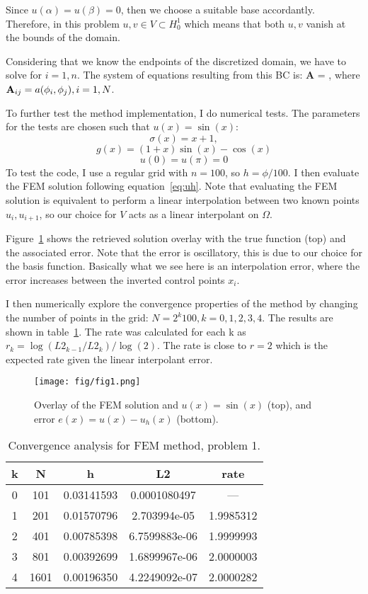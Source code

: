 \documentclass[10pt]{article}
\begin{document}
Since $u(\alpha)=u(\beta)=0$, then we choose a suitable base accordantly. Therefore, in this
problem $u,v \in V \subset H^1_0$ which means that both $u,v$ vanish at the bounds of the domain.

Considering that we know the endpoints of the discretized domain, we have to solve for 
$i=1,n$. The system of equations resulting from this BC is:
\beq
 {\bf A} \vec{\alpha} = ,
\label{eq:sdir}
\eeq
where ${\bf A}_{ij} = a(\phi_i,\phi_j), i=1,N$.

To further test the method implementation, I do numerical tests. The parameters for the tests are chosen
such that $u(x) = \sin(x)$:
\[
\sigma(x) = x+1,
\]
\[
g(x) = (1+x)\sin(x) -\cos(x)
\]
\[
u(0) = u(\pi) = 0
\]
To test the code, I use a regular grid with $n=100$, so $h = \phi/100$. I then evaluate the FEM solution
following equation~\ref{eq:uh}. Note that evaluating the FEM solution is equivalent to perform a linear
interpolation between two known points $u_i,u_{i+1}$, so our choice for $V$ acts as a linear interpolant on $\Omega$.

Figure~\ref{fig:fig1} shows the retrieved solution overlay with the true function (top) and the associated error.
Note that the error is oscillatory, this is due to our choice for the basis function. Basically what we see 
here is an interpolation error, where the error increases between the inverted control points $x_i$.

I then numerically explore the convergence properties of the method by changing the number of points in the grid:
$N = 2^k 100, k=0,1,2,3,4$. The results are shown in table~\ref{tab:table1}. The rate was calculated for 
each k as $r_k = \log(L2_{k-1}/L2_k)/\log(2)$. The rate is close to $r=2$ which is the expected rate given
the linear interpolant error. 


\begin{figure}
\centering
\texttt{[image: fig/fig1.png]}
\caption{Overlay of the FEM solution and $u(x)= \sin(x)$ (top), and error $e(x) = u(x)-u_h(x)$ (bottom).}
\label{fig:fig1}
\end{figure}

\begin{table}
\centering
  \begin{tabular}{c | c | c | c | c}
k&   N &      h    &     L2    &     rate       \\ \hline
0&  101& 0.03141593& 0.0001080497&     ---      \\
1&  201& 0.01570796& 2.703994e-05&  1.9985312   \\
2&  401& 0.00785398& 6.7599883e-06&  1.9999993  \\
3&  801& 0.00392699& 1.6899967e-06&  2.0000003  \\
4& 1601& 0.00196350& 4.2249092e-07&  2.0000282
  \end{tabular}
\caption{Convergence analysis for FEM method, problem 1.}
\label{tab:table1}
\end{table}
\end{document}

